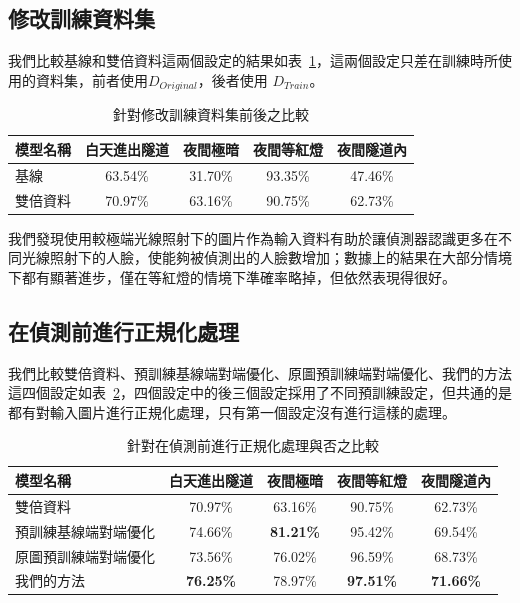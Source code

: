 \subsection{修改訓練資料集}

我們比較基線和雙倍資料這兩個設定的結果如表~\ref{table:data_compare}，這兩個設定只差在訓練時所使用的資料集，前者使用$D_{Original}$，後者使用 $D_{Train}$。

\begin{table}[ht]
    \caption{針對修改訓練資料集前後之比較}
    \centering
    \begin{tabular}{l c c c c}
        \hline
        模型名稱 & 白天進出隧道 & 夜間極暗 & 夜間等紅燈 & 夜間隧道內 \\
        \hline
        基線 & 63.54\% & 31.70\% & 93.35\% & 47.46\% \\
        雙倍資料 & 70.97\% & 63.16\% & 90.75\% & 62.73\% \\
        \hline
    \end{tabular}
    \label{table:data_compare}
\end{table}

我們發現使用較極端光線照射下的圖片作為輸入資料有助於讓偵測器認識更多在不同光線照射下的人臉，使能夠被偵測出的人臉數增加；數據上的結果在大部分情境下都有顯著進步，僅在等紅燈的情境下準確率略掉，但依然表現得很好。

\subsection{在偵測前進行正規化處理}

我們比較雙倍資料、預訓練基線端對端優化、原圖預訓練端對端優化、我們的方法這四個設定如表~\ref{table:normalize_compare}，四個設定中的後三個設定採用了不同預訓練設定，但共通的是都有對輸入圖片進行正規化處理，只有第一個設定沒有進行這樣的處理。

\begin{table}[ht]
    \caption{針對在偵測前進行正規化處理與否之比較}
    \centering
    \begin{tabular}{l c c c c}
        \hline
        模型名稱 & 白天進出隧道 & 夜間極暗 & 夜間等紅燈 & 夜間隧道內 \\
        \hline
        雙倍資料 & 70.97\% & 63.16\% & 90.75\% & 62.73\% \\
        預訓練基線端對端優化 & 74.66\% & \textbf{81.21\%} &95.42\% & 69.54\% \\
        原圖預訓練端對端優化 & 73.56\% & 76.02\% & 96.59\% & 68.73\% \\
        我們的方法 & \textbf{76.25\%} & 78.97\% & \textbf{97.51\%} & \textbf{71.66\%} \\
        \hline
    \end{tabular}
    \label{table:normalize_compare}
\end{table}

